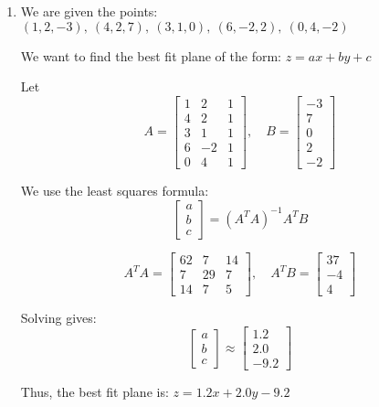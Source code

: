 \documentclass[12pt]{article}
\begin{document}
\begin{enumerate}
\begin{enumerate}
\end{enumerate}

\item 
We are given the points: $(1,2,-3),\ (4,2,7),\ (3,1,0),\ (6,-2,2),\ (0,4,-2)$

We want to find the best fit plane of the form: $z = ax + by + c$

Let
\[
A = \begin{bmatrix}
1 & 2 & 1 \\
4 & 2 & 1 \\
3 & 1 & 1 \\
6 & -2 & 1 \\
0 & 4 & 1
\end{bmatrix}, \quad
B = \begin{bmatrix}
-3 \\
7 \\
0 \\
2 \\
-2
\end{bmatrix}
\]

We use the least squares formula:
\[
\begin{bmatrix}
a \\
b \\
c
\end{bmatrix}
= (A^T A)^{-1} A^T B
\]

\[
A^T A = \begin{bmatrix}
62 & 7 & 14 \\
7 & 29 & 7 \\
14 & 7 & 5
\end{bmatrix}, \quad
A^T B = \begin{bmatrix}
37 \\
-4 \\
4
\end{bmatrix}
\]

Solving gives:
\[
\begin{bmatrix}
a \\
b \\
c
\end{bmatrix}
\approx
\begin{bmatrix}
1.2 \\
2.0 \\
-9.2
\end{bmatrix}
\]

Thus, the best fit plane is: $z = 1.2x + 2.0y - 9.2$


\end{enumerate}
\end{document}
